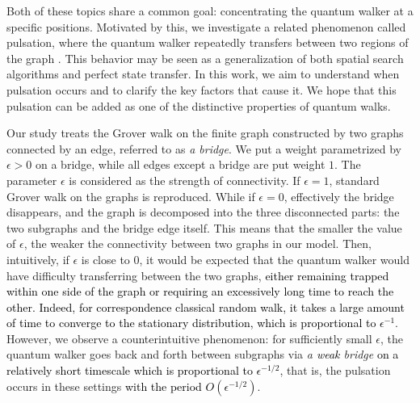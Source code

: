 \documentclass[12pt]{article}
\numberwithin{lemma}{section}
\numberwithin{proposition}{section}
\numberwithin{remark}{section}
\numberwithin{definition}{section}
\newcommand{\red}{\textcolor{black}}
\begin{document}
    Both of these topics share a common goal: concentrating the quantum walker at a specific positions. Motivated by this, we investigate a related phenomenon called pulsation, where the quantum walker repeatedly transfers between two regions of the graph \cite{TS}. This behavior may be seen as a generalization of both spatial search algorithms and perfect state transfer. In this work, we aim to understand when pulsation occurs and to clarify the key factors that cause it. We hope that this pulsation can be added as one of the distinctive properties of quantum walks.

    Our study treats the Grover walk on the finite graph constructed by two graphs connected by an edge, referred to as {\it a bridge}.
    We put a weight parametrized by $\epsilon>0$ on a bridge, while all edges except a bridge are put weight $1$. The parameter $\epsilon$ is considered as the strength of connectivity. If $\epsilon=1$, standard Grover walk on the graphs is reproduced. While if $\epsilon=0$, effectively the bridge disappears, and the graph is decomposed into the three disconnected parts: the two subgraphs and the bridge edge itself.
    This means that the smaller the value of $\epsilon$, the weaker the connectivity between two graphs in our model. Then, intuitively, if $\epsilon$ is close to 0, it would be expected that the quantum walker would have difficulty transferring between the two graphs, \red{either remaining trapped within one side of the graph or requiring an excessively long time to reach the other.
    Indeed,
    for correspondence classical random walk, it takes a large amount of time to converge to the stationary distribution, which is proportional to $\epsilon^{-1}$}.
    However, we observe a counterintuitive phenomenon: for sufficiently small $\epsilon$, the quantum walker goes back and forth between subgraphs via {\it a \red{weak} bridge} \red{on a relatively short timescale which is proportional to $\epsilon^{-1/2}$}, that is, the pulsation occurs in these settings \red{with the  period $O(\epsilon^{-1/2})$}. 
    
\end{document}
